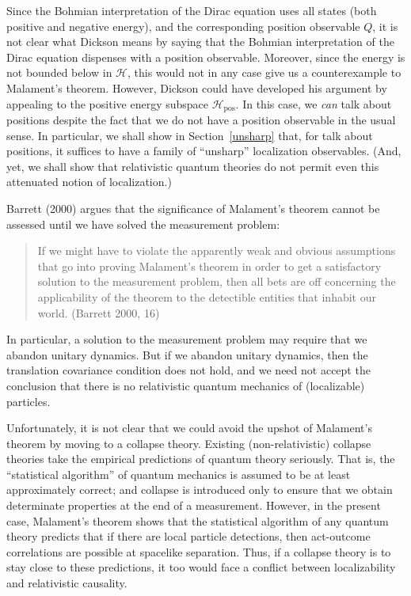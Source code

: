 \documentclass[12pt]{article}
\theoremstyle{remark}
\newcommand{\hil}[1]{\mathcal{#1}}
\begin{document}
Since the Bohmian interpretation of the Dirac equation uses all states
(both positive and negative energy), and the corresponding position
observable $Q$, it is not clear what Dickson means by saying that the
Bohmian interpretation of the Dirac equation dispenses with a position
observable.  Moreover, since the energy is not bounded below in
$\hil{H}$, this would not in any case give us a counterexample to
Malament's theorem.  However, Dickson could have developed his
argument by appealing to the positive energy subspace
$\hil{H}_{\mathrm{pos}}$.  In this case, we \emph{can} talk about
positions despite the fact that we do not have a position observable
in the usual sense.  In particular, we shall show in
Section~\ref{unsharp} that, for talk about positions, it suffices to
have a family of ``unsharp'' localization observables.  (And, yet, we
shall show that relativistic quantum theories do not permit even this
attenuated notion of localization.)

Barrett (2000) argues that the significance of Malament's theorem
cannot be assessed until we have solved the measurement problem:
\begin{quote} If we might have to violate
  the apparently weak and obvious assumptions that go into proving
  Malament's theorem in order to get a satisfactory solution to the
  measurement problem, then all bets are off concerning the
  applicability of the theorem to the detectible entities that inhabit
  our world.  (Barrett 2000, 16) \end{quote} In particular, a solution
to the measurement problem may require that we abandon unitary
dynamics.  But if we abandon unitary dynamics, then the translation
covariance condition does not hold, and we need not accept the
conclusion that there is no relativistic quantum mechanics of
(localizable) particles.

Unfortunately, it is not clear that we could avoid the upshot of
Malament's theorem by moving to a collapse theory.  Existing
(non-relativistic) collapse theories take the empirical predictions of
quantum theory seriously.  That is, the ``statistical algorithm'' of
quantum mechanics is assumed to be at least approximately correct; and
collapse is introduced only to ensure that we obtain determinate
properties at the end of a measurement.  However, in the present case,
Malament's theorem shows that the statistical algorithm of any quantum
theory predicts that if there are local particle detections, then
act-outcome correlations are possible at spacelike separation.  Thus,
if a collapse theory is to stay close to these predictions, it too
would face a conflict between localizability and relativistic
causality.
\end{document}
